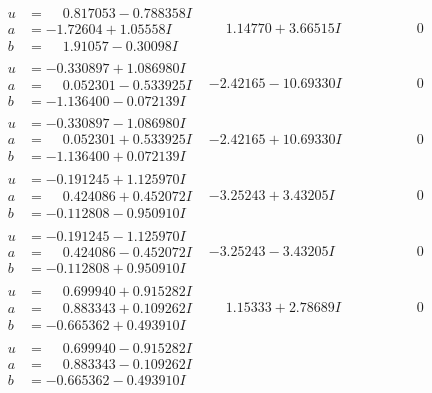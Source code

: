 \documentclass[1p]{elsarticle_modified}
\theoremstyle{definition}
\begin{document}
$$\begin{array}{c|c|c}
\begin{aligned}
u &= \phantom{-}0.817053 - 0.788358 I \\
a &= -1.72604 + 1.05558 I \\
b &= \phantom{-}1.91057 - 0.30098 I\end{aligned}
 & \phantom{-}1.14770 + 3.66515 I & \phantom{-0.000000 } 0 \\ \hline\begin{aligned}
u &= -0.330897 + 1.086980 I \\
a &= \phantom{-}0.052301 - 0.533925 I \\
b &= -1.136400 - 0.072139 I\end{aligned}
 & -2.42165 - 10.69330 I & \phantom{-0.000000 } 0 \\ \hline\begin{aligned}
u &= -0.330897 - 1.086980 I \\
a &= \phantom{-}0.052301 + 0.533925 I \\
b &= -1.136400 + 0.072139 I\end{aligned}
 & -2.42165 + 10.69330 I & \phantom{-0.000000 } 0 \\ \hline\begin{aligned}
u &= -0.191245 + 1.125970 I \\
a &= \phantom{-}0.424086 + 0.452072 I \\
b &= -0.112808 - 0.950910 I\end{aligned}
 & -3.25243 + 3.43205 I & \phantom{-0.000000 } 0 \\ \hline\begin{aligned}
u &= -0.191245 - 1.125970 I \\
a &= \phantom{-}0.424086 - 0.452072 I \\
b &= -0.112808 + 0.950910 I\end{aligned}
 & -3.25243 - 3.43205 I & \phantom{-0.000000 } 0 \\ \hline\begin{aligned}
u &= \phantom{-}0.699940 + 0.915282 I \\
a &= \phantom{-}0.883343 + 0.109262 I \\
b &= -0.665362 + 0.493910 I\end{aligned}
 & \phantom{-}1.15333 + 2.78689 I & \phantom{-0.000000 } 0 \\ \hline\begin{aligned}
u &= \phantom{-}0.699940 - 0.915282 I \\
a &= \phantom{-}0.883343 - 0.109262 I \\
b &= -0.665362 - 0.493910 I\end{aligned}

\end{array}$$
\end{document}
